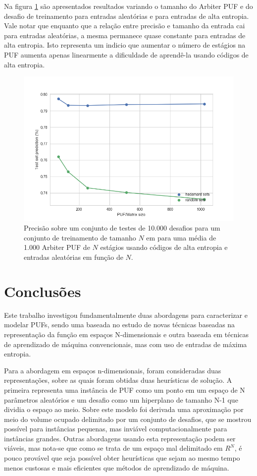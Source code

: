\documentclass[pdftex,11pt]{article}
\begin{document}
\begin{spacing}{1.5}
Na figura \ref{fig:ml-cmp-apuf} são apresentados resultados variando o tamanho do Arbiter PUF e do desafio de treinamento para entradas aleatórias e para entradas de alta entropia. Vale notar que enquanto que a relação entre precisão e tamanho da entrada cai para entradas aleatórias, a mesma permanece quase constante para entradas de alta entropia. Isto representa um indicio que aumentar o número de estágios na PUF aumenta apenas linearmente a dificuldade de aprendê-la usando códigos de alta entropia.

\begin{figure}[H]
\label{fig:ml-cmp-apuf}
\centering
\includegraphics[width=12cm]{ml-cmp-apuf.png}
\caption{Precisão sobre um conjunto de testes de 10.000 desafios para um conjunto de treinamento de tamanho $N$ em para uma média de 1.000 Arbiter PUF de $N$ estágios usando códigos de alta entropia e entradas aleatórias em função de $N$.}
\end{figure}

\section{Conclusões}\label{sec:conclusoes}

Este trabalho investigou fundamentalmente duas abordagens para caracterizar e modelar PUFs, sendo uma baseada no estudo de novas técnicas baseadas na representação da função em espaços N-dimensionais e outra baseada em técnicas de aprendizado de máquina convencionais, mas com uso de entradas de máxima entropia.

Para a abordagem em espaços n-dimensionais, foram consideradas duas representações, sobre as quais foram obtidas duas heurísticas de solução. A primeira representa uma instância de PUF como um ponto em um espaço de N parâmetros aleatórios e um desafio como um hiperplano de tamanho N-1 que dividia o espaço ao meio. Sobre este modelo foi derivada uma aproximação por meio do volume ocupado delimitado por um conjunto de desafios, que se mostrou possível para instâncias pequenas, mas inviável computacionalmente para instâncias grandes. Outras abordagens usando esta representação podem ser viáveis, mas nota-se que como se trata de um espaço mal delimitado em $R^N$, é pouco provável que seja possível obter heurísticas que sejam ao mesmo tempo menos custosas e mais eficientes que métodos de aprendizado de máquina.


\end{spacing}
\end{document}
